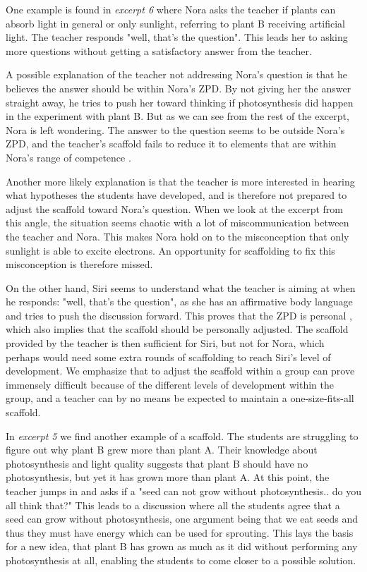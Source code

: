 One example is found in \emph{excerpt 6} where Nora asks the teacher if plants can absorb light in general or only sunlight, referring to plant B receiving artificial light. The teacher responds "well, that's the question". This leads her to asking more questions without getting a satisfactory answer from the teacher. 

A possible explanation of the teacher not addressing Nora's question is that he believes the answer should  be within Nora's ZPD. By not giving her the answer straight away, he tries to push her toward thinking if photosynthesis did happen in the experiment with plant B. But as we can see from the rest of the excerpt, Nora is left wondering. The answer to the question seems to be outside Nora's ZPD, and the teacher's scaffold fails to reduce it to elements that are within Nora's range of competence \citep{wood1976role}. 

Another more likely explanation is that the teacher is more interested in hearing what hypotheses the students have developed, and is therefore not prepared to adjust the scaffold toward Nora's question. When we look at the excerpt from this angle, the situation seems chaotic with a lot of miscommunication between the teacher and Nora. This makes Nora hold on to the misconception that only sunlight is able to excite electrons. An opportunity for scaffolding to fix this misconception is therefore missed.  

On the other hand, Siri seems to understand what the teacher is aiming at when he responds: "well, that's the question", as she has an affirmative body language and tries to push the discussion forward. This proves that the ZPD is personal \citep{vygotskiui1978mind}, which also implies that the scaffold should be personally adjusted. The scaffold provided by the teacher is then sufficient for Siri, but not for Nora, which perhaps would need some extra rounds of scaffolding to reach Siri's level of development. We emphasize that to adjust the scaffold within a group can prove immensely difficult because of the different levels of development within the group, and a teacher can by no means be expected to maintain a one-size-fits-all scaffold.

In \emph{excerpt 5} we find another example of a scaffold. The students are struggling to figure out why plant B grew more than plant A. Their knowledge about photosynthesis and light quality suggests that plant B should have no photosynthesis, but yet it has grown more than plant A. At this point, the teacher jumps in and asks if a "seed can not grow without photosynthesis.. do you all think that?" This leads to a discussion where all the students agree that a seed can grow without photosynthesis, one argument being that we eat seeds and thus they must have energy which can be used for sprouting. This lays the basis for a new idea, that plant B has grown as much as it did without performing any photosynthesis at all, enabling the students to come closer to a possible solution. 

